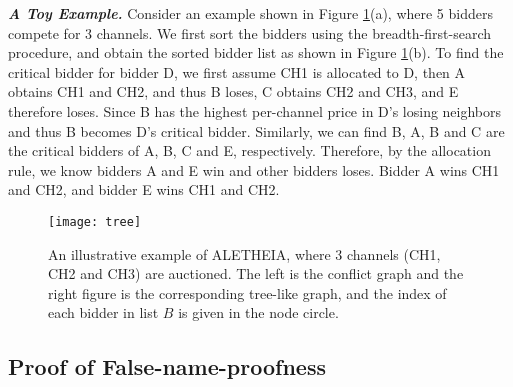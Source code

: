 \documentclass{sig-alternate}
\begin{document}
\textbf{\textit{A Toy Example.}} Consider an example shown in Figure \ref{fig_aletoy}(a), where 5 bidders compete for 3 channels. We first sort the bidders using the breadth-first-search procedure, and obtain the sorted bidder list as shown in Figure \ref{fig_aletoy}(b). To find the critical bidder for bidder D, we first assume CH1 is allocated to D, then A obtains CH1 and CH2, and thus B loses, C obtains CH2 and CH3, and E therefore loses. Since B has the highest per-channel price in D's losing neighbors and thus B becomes D's critical bidder. Similarly, we can find B, A, B and C are the critical bidders of A, B, C and E, respectively. Therefore, by the allocation rule, we know bidders A and E win and other bidders loses. Bidder A wins CH1 and CH2, and bidder E wins CH1 and CH2.


\begin{figure}[!t]
\centering
\texttt{[image: tree]}
\caption{An illustrative example of ALETHEIA, where 3 channels (CH1, CH2 and CH3) are auctioned. The left is the conflict graph and the right figure is the corresponding tree-like graph, and the index of each bidder in list $B$ is given in the node circle.}
\label{fig_aletoy}
\end{figure}


\subsection{Proof of False-name-proofness}
\end{document}
